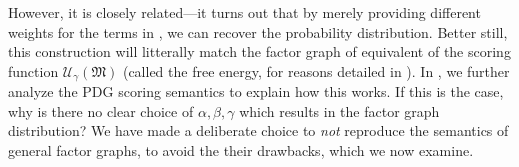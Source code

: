 \documentclass{article}
\theoremstyle{plain}
\newtheorem{coro}{Corollary}[theorem]
\theoremstyle{definition}
\newenvironment{example}
	{\pushQED{\qed}\renewcommand{\qedsymbol}{$\triangle$}\examplex}
	{\popQED\endexamplex%
}
\theoremstyle{remark}
\newcommand{\todo}[1]{{\color{red}\ \!\Large\smash{\textbf{[}}{\normalsize\textsc{todo:} #1}\ \!\smash{\textbf{]}}}}
\newcommand{\dg}[1]{\mathfrak{#1}}
\newcommand{\PDGof}[1]{\dg G(#1)}
\numberwithin{equation}{section}
\begin{document}
{	However, it is closely related---it turns out that by merely providing different weights for the terms in , we can recover the probability distribution. Better still, this construction will litterally match the factor graph of equivalent of the scoring function $\mathcal U_\gamma(\dg M)$ (called the free energy, for reasons detailed in ).
		In , we further analyze the PDG scoring semantics to explain how this works.
		If this is the case, why is there no clear choice of $\alpha,\beta,\gamma$ which results in the factor graph distribution?  
		We have made a deliberate choice to \emph{not} reproduce the semantics of general factor graphs, to avoid the their drawbacks, which 
		we now examine.






}
\end{document}
